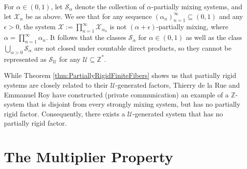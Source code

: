 \documentclass[graybox]{svmult}
\theoremstyle{definition}
\begin{document}
\begin{remark}\label{rem:PartialMixingIsNotUMixing}
    For $\alpha \in (0,1)$, let $\mathcal{S}_\alpha$ denote the collection of $\alpha$-partially mixing systems, and let $\mathcal{X}_\alpha$ be as above.
    We see that for any sequence $(\alpha_n)_{n = 1}^\infty \subseteq (0,1)$ and any $\epsilon > 0$, the system $\mathcal{X} := \prod_{n = 1}^\infty\mathcal{X}_{\alpha_n}$ is not $(\alpha+\epsilon)$-partially mixing, where $\alpha = \prod_{n = 1}^\infty\alpha_n$. 
    It follows that the classes $\mathcal{S}_\alpha$ for $\alpha \in (0,1)$ as well as the class $\bigcup_{\alpha > 0}\mathcal{S}_\alpha$ are not closed under countable direct products, so they cannot be represented as $\mathcal{S}_\mathcal{U}$ for any $\mathcal{U} \subseteq \mathbb{Z}^*$.
\end{remark}

\begin{remark}
    While Theorem \ref{thm:PartiallyRigidFiniteFibers} shows us that partially rigid systems are closely related to their ${\mathcal{U}}$-generated factors, Thierry de la Rue and Emmanuel Roy have constructed (private communication) an example of a $\mathbb{Z}$-system that is disjoint from every strongly mixing system, but has no partially rigid factor.
    Consequently, there exists a ${\mathcal{U}}$-generated system that has no partially rigid factor.
\end{remark}
\section{The Multiplier Property}\label{sec:MultipliersMainResults}
\end{document}
